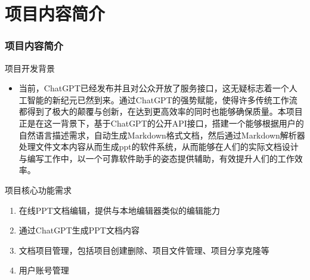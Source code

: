 %
%
%
%
\section{项目内容简介}
    \begin{frame}
    \frametitle{项目内容简介}
        \footnotesize
        \begin{block}{项目开发背景}
            \begin{itemize}
                \item 当前，ChatGPT已经发布并且对公众开放了服务接口，这无疑标志着一个人工智能的新纪元已然到来。通过ChatGPT的强势赋能，使得许多传统工作流都得到了极大的颠覆与创新，在达到更高效率的同时也能够确保质量。本项目正是在这一背景下，基于ChatGPT的公开API接口，搭建一个能够根据用户的自然语言描述需求，自动生成Markdown格式文档，然后通过Markdown解析器处理文件文本内容从而生成ppt的软件系统，从而能够在人们的实际文档设计与编写工作中，以一个可靠软件助手的姿态提供辅助，有效提升人们的工作效率。
            \end{itemize}
        \end{block}

        \begin{block}{项目核心功能需求}
            \begin{enumerate}
                \item 在线PPT文档编辑，提供与本地编辑器类似的编辑能力
                \item 通过ChatGPT生成PPT文档内容
                \item 文档项目管理，包括项目创建删除、项目文件管理、项目分享克隆等
                \item 用户账号管理
            \end{enumerate}
        \end{block}
    \end{frame}

